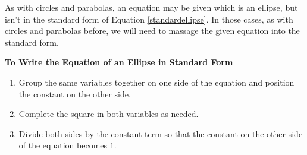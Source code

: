 As with circles and parabolas, an equation may be given which is an ellipse, but isn't in the standard form of Equation \ref{standardellipse}.  In those cases, as with circles and parabolas before, we will need to massage the given equation into the standard form.

\medskip

\colorbox{ResultColor}{\bbm

\centerline{\textbf{To Write the Equation of an Ellipse in Standard Form}}

\begin{enumerate}

\item  Group the same variables together on one side of the equation and position the constant on the other side.

\item  Complete the square in both variables as needed.

\item  Divide both sides by the constant term so that the constant on the other side of the equation becomes $1$.

\end{enumerate}

\ebm}

\medskip

